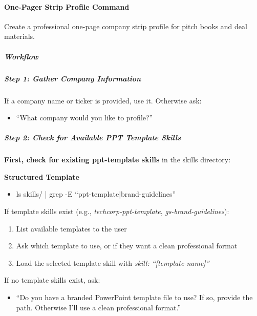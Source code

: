 \documentclass[11pt]{article}
\begin{document}
\paragraph{One-Pager Strip Profile Command}\mbox{}\par

Create a professional one-page company strip profile for pitch books and deal materials.


\subparagraph{Workflow}\mbox{}\par

\subparagraph{Step 1: Gather Company Information}\mbox{}\par

If a company name or ticker is provided, use it. Otherwise ask:

\begin{itemize}[leftmargin=*,itemsep=2pt,topsep=2pt]
\item {} ``What company would you like to profile?''
\end{itemize}

\subparagraph{Step 2: Check for Available PPT Template Skills}\mbox{}\par

\textbf{First, check for existing ppt-template skills} in the skills directory:


\textbf{Structured Template}
\begin{itemize}[leftmargin=*,itemsep=2pt,topsep=2pt]
\item {} ls skills/ | grep -E ``ppt-template|brand-guidelines''
\end{itemize}

If template skills exist (e.g., \emph{techcorp-ppt-template}, \emph{gs-brand-guidelines}):

\begin{enumerate}[leftmargin=*,itemsep=2pt,topsep=2pt]
\item {} List available templates to the user
\item {} Ask which template to use, or if they want a clean professional format
\item {} Load the selected template skill with \emph{skill: ``[template-name]''}
\end{enumerate}

If no template skills exist, ask:

\begin{itemize}[leftmargin=*,itemsep=2pt,topsep=2pt]
\item {} ``Do you have a branded PowerPoint template file to use? If so, provide the path. Otherwise I'll use a clean professional format.''
\end{itemize}
\end{document}
